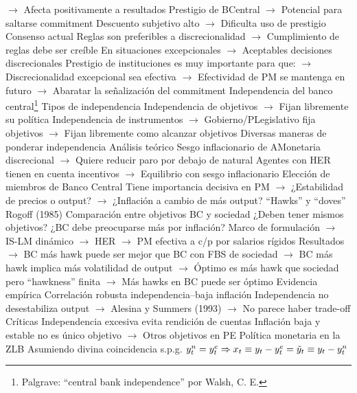 \documentclass{nuevotema}
\begin{document}
\begin{esquemal}
				\4[] $\to$ Afecta positivamente a resultados
				\4[] Prestigio de BCentral
				\4[] $\to$ Potencial para saltarse commitment
				\4[] Descuento subjetivo alto
				\4[] $\to$ Dificulta uso de prestigio
				\4 Consenso actual
				\4[] Reglas son preferibles a discrecionalidad
				\4[] $\to$ Cumplimiento de reglas debe ser creíble
				\4[] En situaciones excepcionales
				\4[] $\to$ Aceptables decisiones discrecionales
				\4[] Prestigio de instituciones es muy importante para que:
				\4[] $\to$ Discrecionalidad excepcional sea efectiva
				\4[] $\to$ Efectividad de PM se mantenga en futuro
				\4[] $\to$ Abaratar la señalización del commitment
			\3 Independencia del banco central\footnote{Palgrave: ``central bank independence'' por Walsh, C. E.}
				\4 Tipos de independencia
				\4[] Independencia de objetivos
				\4[] $\to$ Fijan libremente su política
				\4[] Independencia de instrumentos
				\4[] $\to$ Gobierno/PLegislativo fija objetivos
				\4[] $\to$ Fijan libremente como alcanzar objetivos
				\4[$\to$] Diversas maneras de ponderar independencia
				\4 Análisis teórico
				\4[] Sesgo inflacionario de AMonetaria discrecional
				\4[] $\to$ Quiere reducir paro por debajo de natural
				\4[] Agentes con HER tienen en cuenta incentivos
				\4[] $\to$ Equilibrio con sesgo inflacionario
				\4 Elección de miembros de Banco Central
				\4[] Tiene importancia decisiva en PM
				\4[] $\to$ ¿Estabilidad de precios o output?
				\4[] $\to$ ¿Inflación a cambio de más output?
				\4[] ``Hawks'' y ``doves''
				\4 Rogoff (1985)
				\4[] Comparación entre objetivos BC y sociedad
				\4[] ¿Deben tener mismos objetivos?
				\4[] ¿BC debe preocuparse más por inflación?
				\4[] Marco de formulación
				\4[] $\to$ IS-LM dinámico
				\4[] $\to$ HER
				\4[] $\to$ PM efectiva a c/p por salarios rígidos
				\4[] Resultados
				\4[] $\to$ BC más hawk puede ser mejor que BC con FBS de sociedad
				\4[] $\to$ BC más hawk implica más volatilidad de output
				\4[] $\to$ Óptimo es más hawk que sociedad pero ``hawkness'' finita
				\4[] $\to$ Más hawks en BC puede ser óptimo
				\4 Evidencia empírica
				\4[] Correlación robusta independencia--baja inflación
				\4[] Independencia no desestabiliza output
				\4[] $\to$ Alesina y Summers (1993)
				\4[] $\to$ No parece haber trade-off
				\4 Críticas
				\4[] Independencia excesiva evita rendición de cuentas
				\4[] Inflación baja y estable no es único objetivo
				\4[] $\to$ Otros objetivos en PE
			\3 Política monetaria en la ZLB
				\4 Asumiendo divina coincidencia s.p.g.
				\4[] $y_t^n = y_t^e \Rightarrow x_t \equiv y_t - y_t^e = \tilde{y}_t \equiv y_t - y_t^n$

\end{esquemal}
\end{document}
